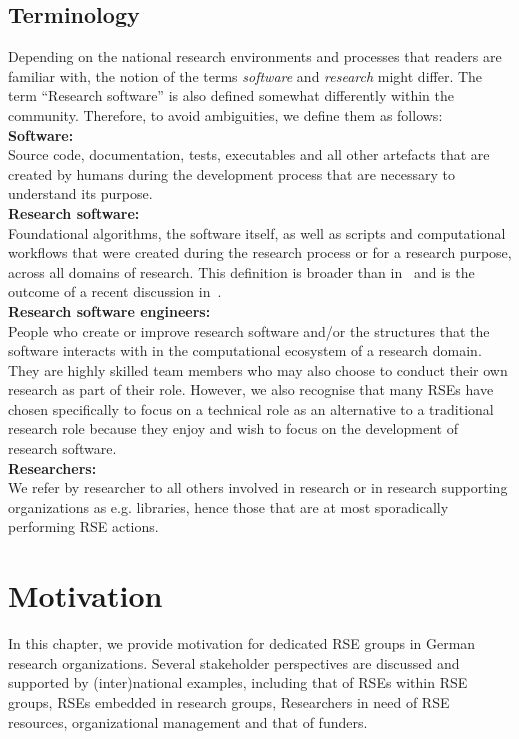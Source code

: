 \documentclass{article}
\makeatletter
\newcommand*{\eg}{e.g.\@\xspace}
\makeatother
\begin{document}
\subsection{Terminology}
Depending on the national research
environments and processes that readers are familiar with, the notion of the terms \emph{software} and \emph{research} might differ.
The term “Research software” is also defined somewhat differently within the community.
Therefore, to avoid ambiguities, we define them as follows:\\
\textbf{Software:}\\
Source code, documentation, tests, executables
and all other artefacts that are created by humans during the development process
that are necessary to understand its purpose.\\
\textbf{Research software:}\\
Foundational algorithms, the software itself,
as well as scripts and computational workflows that were created
during the research process or for a research purpose, across all domains of research.
This definition is broader than in~\autocite{FAIR4RS} and is the outcome of a recent
discussion in~\autocite{Gruenpeter2021}.\\
\textbf{Research software engineers:}\\
People who
create or improve research software and/or the structures that the software interacts with
in the computational ecosystem of a research domain.
They are highly skilled team members who may also choose to conduct their own research as
part of their role.
However, we also recognise that many RSEs have chosen specifically to focus on a technical
role as an alternative to a traditional research role because they enjoy and wish to focus
on the development of research software.\\
\textbf{Researchers:}\\
We refer by researcher to all others involved in research or in research supporting organizations as \eg libraries,
hence those that are at most sporadically performing RSE actions.

\section{Motivation}

In this chapter, we provide motivation for dedicated RSE groups in German research organizations.
Several stakeholder perspectives are discussed and supported by (inter)national examples, including that of RSEs within RSE groups, RSEs embedded in research groups, Researchers in need of RSE resources, organizational management and that of funders.
\end{document}
